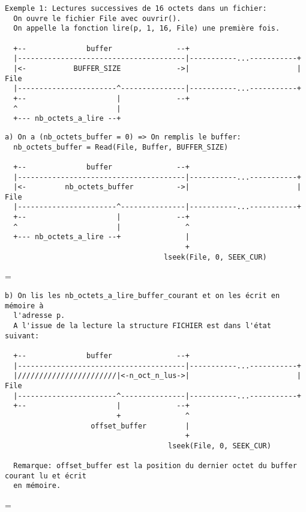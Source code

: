 \documentclass[11pt]{article}
\newenvironment{absolutelynopagebreak}
  {\par\nobreak\vfil\penalty0\vfilneg
   \vtop\bgroup}
  {\par\xdef\tpd{\the\prevdepth}\egroup
   \prevdepth=\tpd}
\theoremstyle{definition}
\theoremstyle{definition}
\begin{document}
\begin{lstlisting}[columns=fixed,basicstyle=\scriptsize\ttfamily]
  Exemple 1: Lectures successives de 16 octets dans un fichier:
  On ouvre le fichier File avec ouvrir().
  On appelle la fonction lire(p, 1, 16, File) une première fois.

  +--              buffer               --+
  |---------------------------------------|-----------...-----------+
  |<-           BUFFER_SIZE             ->|                         | File
  |-----------------------^---------------|-----------...-----------+
  +--                     |             --+
  ^                       |
  +--- nb_octets_a_lire --+
\end{lstlisting}

\begin{absolutelynopagebreak}
\begin{lstlisting}[columns=fixed,basicstyle=\scriptsize\ttfamily]
  a) On a (nb_octets_buffer = 0) => On remplis le buffer:
  nb_octets_buffer = Read(File, Buffer, BUFFER_SIZE)

  +--              buffer               --+
  |---------------------------------------|-----------...-----------+
  |<-         nb_octets_buffer          ->|                         | File
  |-----------------------^---------------|-----------...-----------+
  +--                     |             --+
  ^                       |               ^
  +--- nb_octets_a_lire --+               |
                                          +
                                     lseek(File, 0, SEEK_CUR)
\end{lstlisting}
\end{absolutelynopagebreak}

\begin{absolutelynopagebreak}
\begin{lstlisting}[columns=fixed,basicstyle=\scriptsize\ttfamily]
  b) On lis les nb_octets_a_lire_buffer_courant et on les écrit en mémoire à
  l'adresse p.
  A l'issue de la lecture la structure FICHIER est dans l'état suivant:

  +--              buffer               --+
  |---------------------------------------|-----------...-----------+
  |///////////////////////|<-n_oct_n_lus->|                         | File
  |-----------------------^---------------|-----------...-----------+
  +--                     |             --+
                          +               ^
                    offset_buffer         |
                                          +
                                      lseek(File, 0, SEEK_CUR)

  Remarque: offset_buffer est la position du dernier octet du buffer courant lu et écrit
  en mémoire.
\end{lstlisting}
\end{absolutelynopagebreak}
\end{document}
